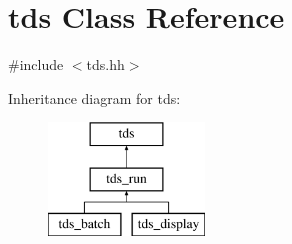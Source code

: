 \hypertarget{classtds}{\section{tds Class Reference}
\label{classtds}
}


{\ttfamily \#include $<$tds.\-hh$>$}

Inheritance diagram for tds\-:\begin{figure}[H]
\begin{center}
\leavevmode
\includegraphics[height=3.000000cm]{classtds}
\end{center}
\end{figure}
